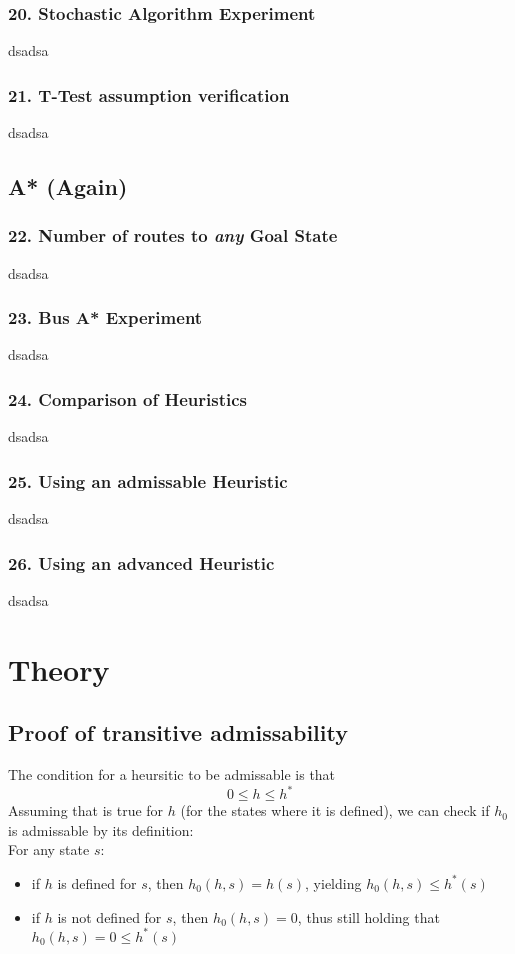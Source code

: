 \documentclass{article}
\begin{document}
\subsubsection*{20. Stochastic Algorithm Experiment}
dsadsa

\subsubsection*{21. T-Test assumption verification}
dsadsa

\subsection*{A* (Again)}
\subsubsection*{22. Number of routes to \emph{any} Goal State}
dsadsa

\subsubsection*{23. Bus A* Experiment}
dsadsa

\subsubsection*{24. Comparison of Heuristics}
dsadsa

\subsubsection*{25. Using an admissable Heuristic}
dsadsa

\subsubsection*{26. Using an advanced Heuristic}
dsadsa

\section {Theory}
\subsection*{Proof of transitive admissability}
The condition for a heursitic to be admissable is that 
$$ 0 \leq h \leq h^* $$
Assuming that is true for $h$ (for the states where it is defined), we can check if $h_0$ is admissable by its definition: \\ 
For any state $s$:
\begin{itemize}
\item if $h$ is defined for $s$, then $h_0(h,s) = h(s)$, yielding $h_0(h,s) \leq h^*(s) $
\item if $h$ is not defined for $s$, then $h_0(h,s) = 0$, thus still holding that $  h_0(h,s) = 0 \leq h^*(s) $
\end{itemize}
\end{document}
